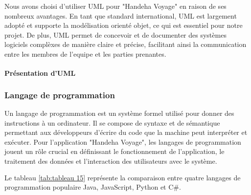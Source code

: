 \documentclass[12pt]{report}
\begin{document}
				Nous avons choisi d'utiliser UML pour "Handeha Voyage" en raison de ses nombreux avantages. En tant que standard international, UML est largement adopté et supporte la modélisation orienté objet, ce qui est essentiel pour notre projet. De plus, UML permet de concevoir et de documenter des systèmes logiciels complèxes de manière claire et précise, facilitant ainsi la communication entre les membres de l'equipe et les parties prenantes.

				\paragraph{Présentation d'UML}


				\subsubsection{Langage de programmation}

				\hspace{15pt} Un langage de programmation est un système formel utilisé pour donner des instructions à un ordinateur. Il se compose de syntaxe et de sémantique permettant aux développeurs d'écrire du code que la machine peut interpréter et exécuter. Pour l'application "Handeha Voyage", les langages de programmation jouent un rôle crucial en définissant le fonctionnement de l'application, le traitement des données et l'interaction des utilisateurs avec le système.

				
				Le tableau \ref{tab:tableau 15} représente la comparaison entre quatre langages de programmation populaire Java, JavaScript, Python et C\#.
				
\end{document}
